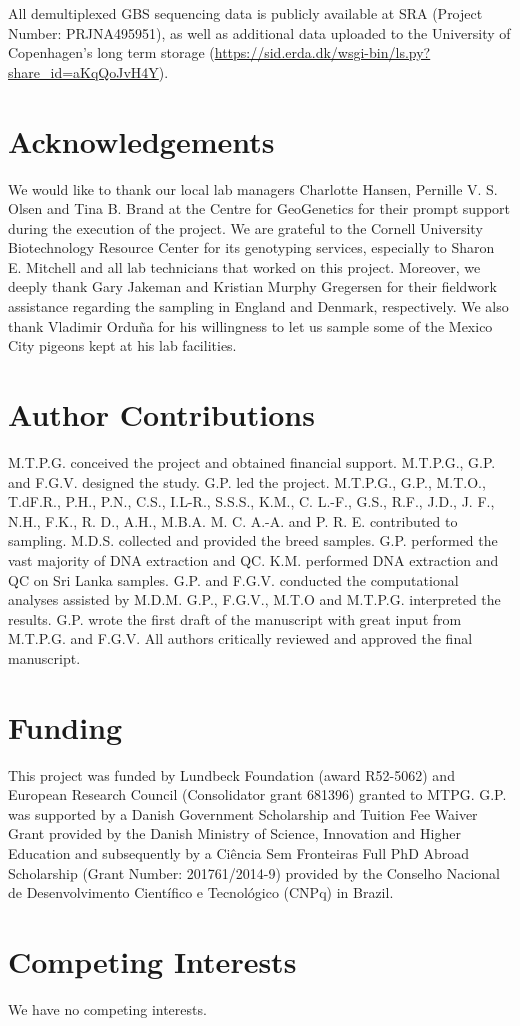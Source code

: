 \documentclass[twoside, british, a4paper]{article}
\begin{document}
\begin{multicols}{2}
\noindent All demultiplexed GBS sequencing data is publicly available at SRA (Project Number: PRJNA495951), as well as additional data uploaded to the University of Copenhagen’s long term storage (\url{https://sid.erda.dk/wsgi-bin/ls.py?share_id=aKqQoJvH4Y}).

\section*{Acknowledgements}

\noindent We would like to thank our local lab managers Charlotte Hansen, Pernille V. S. Olsen and Tina B. Brand at the Centre for GeoGenetics for their prompt support during the execution of the project. We are grateful to the Cornell University Biotechnology Resource Center for its genotyping services, especially to Sharon E. Mitchell and all lab technicians that worked on this project. Moreover, we deeply thank Gary Jakeman and Kristian Murphy Gregersen for their fieldwork assistance regarding the sampling in England and Denmark, respectively. We also thank Vladimir Orduña for his willingness to let us sample some of the Mexico City pigeons kept at his lab facilities.

\section*{Author Contributions}
\noindent M.T.P.G. conceived the project and obtained financial support. M.T.P.G., G.P. and F.G.V. designed the study. G.P. led the project. M.T.P.G., G.P., M.T.O., T.dF.R., P.H., P.N., C.S., I.L-R., S.S.S., K.M., C. L.-F., G.S., R.F., J.D., J. F., N.H., F.K., R. D., A.H., M.B.A. M. C. A.-A. and P. R. E. contributed to sampling. M.D.S. collected and provided the breed samples. G.P. performed the vast majority of DNA extraction and QC. K.M. performed DNA extraction and QC on Sri Lanka samples. G.P. and F.G.V. conducted the computational analyses assisted by M.D.M. G.P., F.G.V., M.T.O and M.T.P.G. interpreted the results. G.P. wrote the first draft of the manuscript with great input from M.T.P.G. and F.G.V. All authors critically reviewed and approved the final manuscript.


\section*{Funding}
\noindent This project was funded by Lundbeck Foundation (award R52-5062) and European Research Council (Consolidator grant 681396) granted to MTPG. G.P. was supported by a Danish Government Scholarship and Tuition Fee Waiver Grant provided by the Danish Ministry of Science, Innovation and Higher Education and subsequently by a Ciência Sem Fronteiras Full PhD Abroad Scholarship (Grant Number: 201761/2014-9) provided by the Conselho Nacional de Desenvolvimento Científico e Tecnológico (CNPq) in Brazil.

\section*{Competing Interests}
\noindent We have no competing interests.



\end{multicols}
\end{document}
